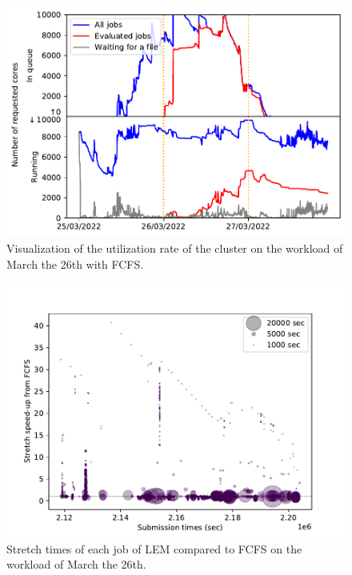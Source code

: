 \documentclass[conference,10pt]{IEEEtran}
\begin{document}
\begin{figure}[H]\centering\includegraphics[scale=0.47]{../MBSS/plot/Cluster_usage/2022-03-26->2022-03-26_V10000_Fcfs_Used_nodes_Reduced_450_128_32_256_4_1024_core_by_core.pdf}\caption{Visualization of the utilization rate of the cluster on the workload of March the 26th with FCFS.}\end{figure}
\begin{figure}[H]\centering\includegraphics[scale=0.47]{../MBSS/plot/Stretch_times/Stretch_times_FCFS_EFT-SCORE-MIX_2022-03-26->2022-03-26_V10000_450_128_32_256_4_1024.pdf}\caption{Stretch times of each job of LEM compared to FCFS on the workload of March the 26th.}\end{figure}

\end{document}
